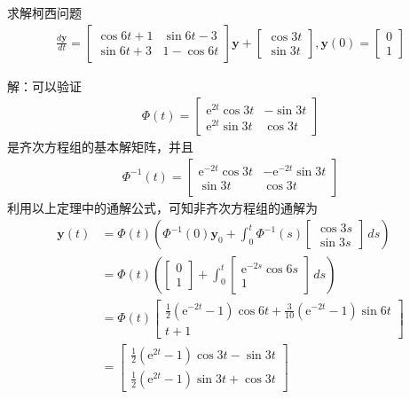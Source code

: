 \documentclass{ctexbook}
\begin{document}
\begin{example}
    求解柯西问题\begin{align*}
    \frac{d\mathbf{y}}{dt}=\begin{bmatrix}
    \cos 6t+1 & \sin 6t-3\\
    \sin 6t+3 & 1-\cos 6t
    \end{bmatrix}\mathbf{y}+\begin{bmatrix}
        \cos 3t\\
        \sin 3t
    \end{bmatrix},\mathbf{y}(0)=\begin{bmatrix}
    0\\
    1
    \end{bmatrix}
    \end{align*}

    解：可以验证\begin{align*}
        \Phi(t)=\begin{bmatrix}
        \mathrm{e}^{2t}\cos 3t & -\sin 3t\\
        \mathrm{e}^{2t}\sin 3t & \cos 3t
        \end{bmatrix}
    \end{align*}
    是齐次方程组的基本解矩阵，并且\begin{align*}
        \Phi^{-1}(t)=\begin{bmatrix}
        \mathrm{e}^{-2t}\cos 3t & -\mathrm{e}^{-2t}\sin 3t\\
        \sin 3t & \cos 3t
        \end{bmatrix}
    \end{align*}
    利用以上定理中的通解公式，可知非齐次方程组的通解为\begin{align*}
    \mathbf{y}(t)&=\Phi(t)\left(\Phi^{-1}(0)\mathbf{y}_0+\int_{0}^t \Phi^{-1}(s)\begin{bmatrix}
        \cos 3s\\
        \sin 3s
    \end{bmatrix}\,ds\right)\\
    &=\Phi(t)\left(\begin{bmatrix}0\\1\end{bmatrix}+\int_{0}^t \begin{bmatrix}
        \mathrm{e}^{-2s}\cos 6s\\
        1
        \end{bmatrix}\,ds\right)\\
    &=\Phi(t)\begin{bmatrix}
        \frac{1}{2}(\mathrm{e}^{-2t}-1)\cos 6t+\frac{3}{10}(\mathrm{e}^{-2t}-1)\sin 6t\\
        t+1
        \end{bmatrix}\\
    &=\begin{bmatrix}
        \frac{1}{2}(\mathrm{e}^{2t}-1)\cos 3t-\sin 3t\\
        \frac{1}{2}(\mathrm{e}^{2t}-1)\sin 3t+\cos 3t
    \end{bmatrix}
    \end{align*}
\end{example}
\end{document}
